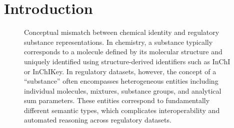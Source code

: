 \section{Introduction}
\label{sec:introduction}


\begin{figure}[!ht]
	\centering                                                                                                                                                                                                                                                                                                                                                                                                           
	\caption{Conceptual mismatch between chemical identity and regulatory substance representations.
		In chemistry, a substance typically corresponds to a molecule defined by its molecular structure and uniquely identified using structure-derived identifiers such as InChI or InChIKey. In regulatory datasets, however, the concept of a “substance” often encompasses heterogeneous entities including individual molecules, mixtures, substance groups, and analytical sum parameters. These entities correspond to fundamentally different semantic types, which complicates interoperability and automated reasoning across regulatory datasets.} \label{fig:mismatch}                                                                                                                                                                                                                                                                                                                                                                  
\end{figure}   



